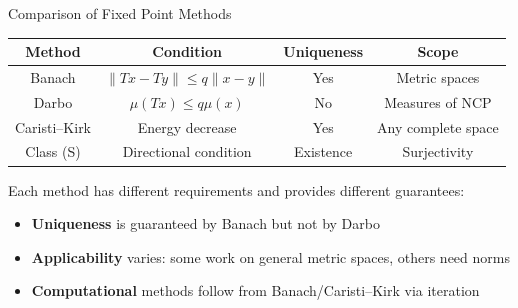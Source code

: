 \documentclass[aspectratio=169,10pt]{beamer}
\begin{document}
\begin{frame}{Comparison of Fixed Point Methods}{}
\begin{center}
\begin{tabular}{|c|c|c|c|}
\hline
\textbf{Method} & \textbf{Condition} & \textbf{Uniqueness} & \textbf{Scope} \\
\hline
Banach & $\|Tx-Ty\| \leq q\|x-y\|$ & Yes & Metric spaces \\
\hline
Darbo & $\mu(Tx) \leq q\mu(x)$ & No & Measures of NCP \\
\hline
Caristi--Kirk & Energy decrease & Yes & Any complete space \\
\hline
Class (S) & Directional condition & Existence & Surjectivity \\
\hline
\end{tabular}
\end{center}

\medskip

Each method has different requirements and provides different guarantees:
\begin{itemize}
    \item \textbf{Uniqueness} is guaranteed by Banach but not by Darbo
    \item \textbf{Applicability} varies: some work on general metric spaces, others need norms
    \item \textbf{Computational} methods follow from Banach/Caristi--Kirk via iteration
\end{itemize}
\end{frame}
\end{document}
